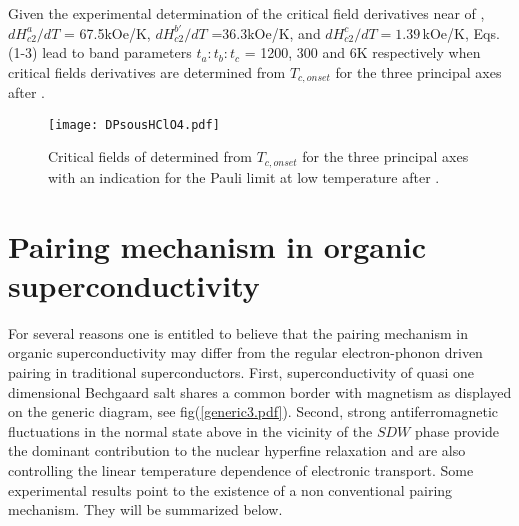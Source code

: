 \documentclass[11pt]{article} %
\begin{document}

Given the experimental determination of the critical field derivatives near \tc of \tmc\cite{Yonezawa08,Yonezawa08a}, $dH_{c2}^a/dT$  = 67.5kOe/K, $dH_{c2}^{b\prime}/dT$ =36.3kOe/K, and $dH_{c2}^c/dT=1.39$\,kOe/K,  Eqs.(1-3) lead to band parameters $t_a : t_b : t_c$ = 1200, 300 and 6K respectively when critical fields derivatives  are determined from $T_{c,onset}$ for the three principal axes after \cite{Yonezawa08,Yonezawa08a}.


\begin{figure}[h]			
\centerline{\texttt{[image: DPsousHClO4.pdf]}}
\caption{Critical fields of \tmc determined from $T_{c,onset}$ for the three principal axes with an indication for the Pauli limit at low temperature after \cite{Yonezawa08,Yonezawa08a}.}
\label{DPsousHClO4.pdf}
\end{figure}

\section{Pairing mechanism in organic superconductivity}
\label{Pairing mechanism}
For several reasons one is entitled to believe that the pairing mechanism in organic superconductivity may differ from the regular electron-phonon driven pairing in traditional superconductors.  First, superconductivity of  quasi one dimensional Bechgaard salt shares a common border with magnetism as displayed on the generic diagram, see fig(\ref{generic3.pdf}). Second, strong antiferromagnetic  fluctuations  in the normal state above \tc in the vicinity of the $SDW$ phase provide the dominant contribution to the nuclear hyperfine relaxation   and are also controlling the linear temperature dependence of electronic transport. Some experimental results point to the existence of a non conventional pairing mechanism. They will be summarized below.
\end{document}
